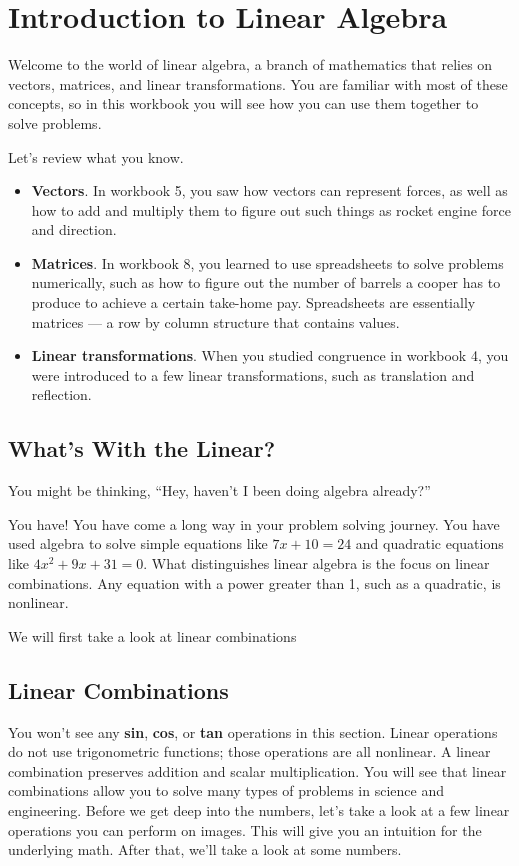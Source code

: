 \chapter{Introduction to Linear Algebra}

Welcome to the world of linear algebra, a branch of mathematics that relies on vectors, matrices, and linear transformations. You are familiar with most of these concepts, so in this workbook you will see how you can use them together to solve problems.  

Let’s review what you know.

\begin{itemize}
\item \textbf{Vectors}. In workbook 5, you saw how vectors can represent forces, as well as how to add and multiply them to figure out such things as rocket engine force and direction. 
\item \textbf{Matrices}. In workbook 8, you learned to use spreadsheets to solve problems numerically, such as how to figure out the number of barrels a cooper has to produce to achieve a certain take-home pay. Spreadsheets are essentially matrices --- a row by column structure that contains values. 
\item \textbf{Linear transformations}. When you studied congruence in workbook 4, you were introduced to a few linear transformations, such as translation and reflection. 
\end{itemize}

\section{What's With the Linear?}

You might be thinking, “Hey, haven’t I been doing algebra already?” 

You have! You have come a long way in your problem solving journey. You have used algebra to solve simple equations like $7x + 10 = 24$ and quadratic equations like $4x^{2} + 9x + 31 = 0$. What distinguishes linear algebra is the focus on linear combinations. Any equation with a power greater than 1, such as a quadratic, is nonlinear.

We will first take a look at linear combinations

\section{Linear Combinations}

You won’t see any \textbf{sin}, \textbf{cos}, or \textbf{tan} operations in this section. Linear operations do not use trigonometric functions; those operations are all nonlinear. A linear combination  preserves addition and scalar multiplication. You will see that linear combinations allow you to solve many types of problems in science and engineering. Before we get deep into the numbers, let’s take a look at a few linear operations you can perform on images. This will give you an intuition for the underlying math. After that, we’ll take a look at some numbers.

